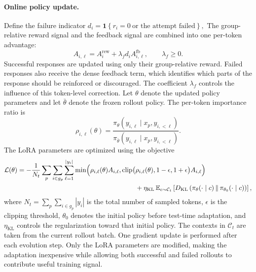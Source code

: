 \documentclass{article} %
\begin{document}
\paragraph{Online policy update.}
Define the failure indicator
$d_i
=
\mathbf{1}
\left\{
r_i=0
\ \text{or the attempt failed}
\right\},$
The group-relative reward signal and the feedback signal are combined into one
per-token advantage:
\begin{equation*}
A_{i,\ell}
=
A_i^{\mathrm{rew}}
+
\lambda_f d_i A_{i,\ell}^{\mathrm{fb}},
\qquad
\lambda_f\geq 0.
\label{eq:combined-advantage}
\end{equation*}
Successful responses are updated using only their group-relative reward.
Failed responses also receive the dense feedback term, which identifies which
parts of the response should be reinforced or discouraged. The coefficient
$\lambda_f$ controls the influence of this token-level correction.
Let $\theta$ denote the updated policy parameters and let
$\bar{\theta}$ denote the frozen rollout policy. The per-token importance ratio
is
\begin{equation}
\rho_{i,\ell}(\theta)
=
\frac{
\pi_{\theta}
\left(
y_{i,\ell}\mid x_p,y_{i,<\ell}
\right)
}{
\pi_{\bar{\theta}}
\left(
y_{i,\ell}\mid x_p,y_{i,<\ell}
\right)
}.
\label{eq:importance-ratio}
\end{equation}
The LoRA parameters are optimized using the objective
\begin{align}
\mathcal{L}(\theta)
=
-
\frac{1}{N_t}
\sum_p
\sum_{i\in g_p}
\sum_{\ell=1}^{|y_i|}
\min
\Bigl(
\rho_{i,\ell}(\theta)A_{i,\ell},
\nonumber
\operatorname{clip}
\bigl( &
\rho_{i,\ell}(\theta), 
1-\epsilon,
1+\epsilon
\bigr)
A_{i,\ell}
\Bigr)
\nonumber\\
&+
\eta_{\mathrm{KL}}\,
\mathbb{E}_{c\sim\mathcal{C}_t}
\left[
D_{\mathrm{KL}}
\left(
\pi_{\theta}(\cdot\mid c)
\,\Vert\,
\pi_{\theta_0}(\cdot\mid c)
\right)
\right],
\label{eq:test-time-rl-loss}
\end{align}
where
$N_t
=
\sum_p\sum_{i\in g_p}|y_i|$
is the total number of sampled tokens, $\epsilon$ is the clipping threshold,
$\theta_0$ denotes the initial policy before test-time adaptation, and
$\eta_{\mathrm{KL}}$ controls the regularization toward that initial policy.
The contexts in $\mathcal{C}_t$ are taken from the current rollout batch.
One gradient update is performed after each evolution step. Only the LoRA
parameters are modified, making the adaptation inexpensive while allowing both
successful and failed rollouts to contribute useful training signal.
\end{document}
